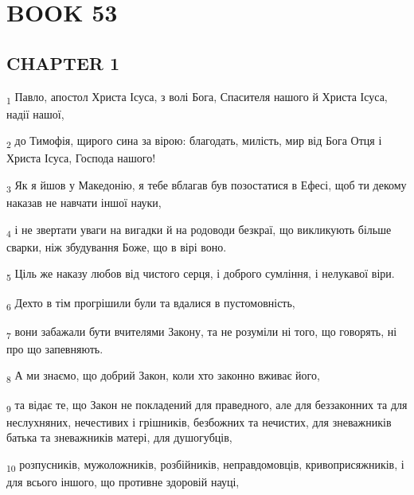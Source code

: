 \section{BOOK 53}
\subsection{CHAPTER 1}
\begin{tcolorbox}
\textsubscript{1} Павло, апостол Христа Ісуса, з волі Бога, Спасителя нашого й Христа Ісуса, надії нашої,
\end{tcolorbox}
\begin{tcolorbox}
\textsubscript{2} до Тимофія, щирого сина за вірою: благодать, милість, мир від Бога Отця і Христа Ісуса, Господа нашого!
\end{tcolorbox}
\begin{tcolorbox}
\textsubscript{3} Як я йшов у Македонію, я тебе вблагав був позостатися в Ефесі, щоб ти декому наказав не навчати іншої науки,
\end{tcolorbox}
\begin{tcolorbox}
\textsubscript{4} і не звертати уваги на вигадки й на родоводи безкраї, що викликують більше сварки, ніж збудування Боже, що в вірі воно.
\end{tcolorbox}
\begin{tcolorbox}
\textsubscript{5} Ціль же наказу любов від чистого серця, і доброго сумління, і нелукавої віри.
\end{tcolorbox}
\begin{tcolorbox}
\textsubscript{6} Дехто в тім прогрішили були та вдалися в пустомовність,
\end{tcolorbox}
\begin{tcolorbox}
\textsubscript{7} вони забажали бути вчителями Закону, та не розуміли ні того, що говорять, ні про що запевняють.
\end{tcolorbox}
\begin{tcolorbox}
\textsubscript{8} А ми знаємо, що добрий Закон, коли хто законно вживає його,
\end{tcolorbox}
\begin{tcolorbox}
\textsubscript{9} та відає те, що Закон не покладений для праведного, але для беззаконних та для неслухняних, нечестивих і грішників, безбожних та нечистих, для зневажників батька та зневажників матері, для душогубців,
\end{tcolorbox}
\begin{tcolorbox}
\textsubscript{10} розпусників, мужоложників, розбійників, неправдомовців, кривоприсяжників, і для всього іншого, що противне здоровій науці,
\end{tcolorbox}
